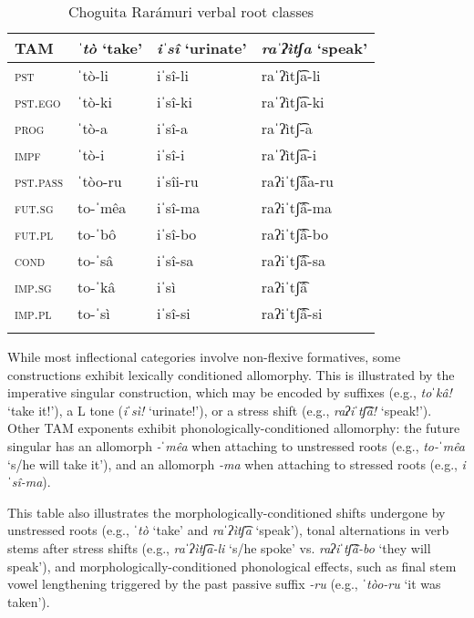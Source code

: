 \begin{table}
\caption{Choguita Rarámuri verbal root classes}
\label{tab:inflection-paradigms}

\begin{tabularx}{\textwidth}{XXXX}
\lsptoprule
\textbf{TAM} & \textbf{\textit{ˈtò} `take'} & \textbf{\textit{iˈsî} `urinate'}  & \textbf{\textit{raˈʔìtʃa} `speak'} \\
\midrule
\textsc{pst} &  ˈtò-li  &     iˈsî-li      &  raˈʔìtʃ͡a-li \\
\textsc{pst.ego} &  ˈtò-ki  &     iˈsî-ki      &   raˈʔìtʃ͡a-ki \\
\textsc{prog} &  ˈtò-a &    iˈsî-a &  raˈʔìtʃ͡-a    \\
\textsc{impf} &   ˈtò-i &   iˈsî-i  &  raˈʔìtʃ͡a-i  \\
\textsc{pst.pass} &  ˈtòo-ru    & iˈsîi-ru    &  raʔiˈtʃ͡âa-ru \\
\textsc{fut.sg} & to-ˈmêa   &          iˈsî-ma   &    raʔiˈtʃ͡â-ma \\
\textsc{fut.pl} & to-ˈbô   &          iˈsî-bo   &     raʔiˈtʃ͡â-bo \\
\textsc{cond} &  to-ˈsâ & iˈsî-sa    &  raʔiˈtʃ͡â-sa \\
\textsc{imp.sg} &  to-ˈkâ    & iˈsì    &  raʔiˈtʃ͡â \\
\textsc{imp.pl} &  to-ˈsì    & iˈsî-si    &  raʔiˈtʃ͡â-si \\
\lspbottomrule
\end{tabularx}
\end{table}

While most inflectional categories involve non-flexive formatives, some constructions exhibit lexically conditioned allomorphy. This is illustrated by the imperative singular construction, which may be encoded by suffixes (e.g., \textit{toˈkâ!} `take it!'), a L tone (\textit{iˈsì!} `urinate!'), or a stress shift (e.g., \textit{raʔiˈtʃ͡â!} `speak!'). Other TAM exponents exhibit phonologically-conditioned allomorphy: the future singular has an allomorph \textit{-ˈmêa} when attaching to unstressed roots (e.g., \textit{to-ˈmêa} `s/he will take it'), and an allomorph \textit{-ma} when attaching to stressed roots (e.g., \textit{iˈsî-ma}).

This table also illustrates the morphologically-conditioned shifts undergone by unstressed roots (e.g., \textit{ˈtò} `take' and \textit{raˈʔìtʃ͡a} `speak'), tonal alternations in verb stems after stress shifts (e.g., \textit{raˈʔìtʃ͡a-li} `s/he spoke' vs. \textit{raʔiˈtʃ͡â-bo} `they will speak'), and morphologically-conditioned phonological effects, such as final stem vowel lengthening triggered by the past passive suffix \textit{-ru} (e.g., \textit{ˈtòo-ru} `it was taken').

